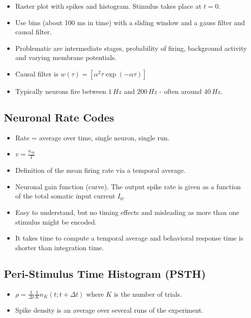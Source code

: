 \documentclass[a4paper, 12pt]{article}
\begin{document}
\begin{itemize}[noitemsep,nolistsep]
	\item Raster plot with spikes and histogram. Stimulus takes place at $t = 0$.
	\item Use bins (about 100 ms in time) with a sliding window and a gauss filter and causal filter.
	\item Problematic are intermediate stages, probability of firing, background activity and varying membrane potentials.
	\item Causal filter is $w(\tau) = [\alpha^2\tau\exp(-\alpha\tau)]$
	\item Typically neurons fire between $1\,Hz$ and $200\,Hz$ - often around $40\,Hz$.
\end{itemize}

\subsection{Neuronal Rate Codes}
\begin{itemize}[noitemsep,nolistsep]
	\item Rate = average over time, single neuron, single run.
	\item $v = \frac{n_{sp}}{T}$
	\item Definition of the mean firing rate via a temporal average.
	\item Neuronal gain function (curve). The output spike rate is given as a function of the total somatic input current $I_0$.
	\item Easy to understand, but no timing effects and misleading as more than one stimulus might be encoded.
	\item It takes time to compute a temporal average and behavioral response time is shorter than integration time.
\end{itemize}

\subsection{Peri-Stimulus Time Histogram (PSTH)}
\begin{itemize}[noitemsep,nolistsep]
	\item $\rho = \frac{1}{\Delta t}\frac{1}{K}n_K(t;t+\Delta t)$ where $K$ is the number of trials.
	\item Spike density is an average over several runs of the experiment.
\end{itemize}
\end{document}
